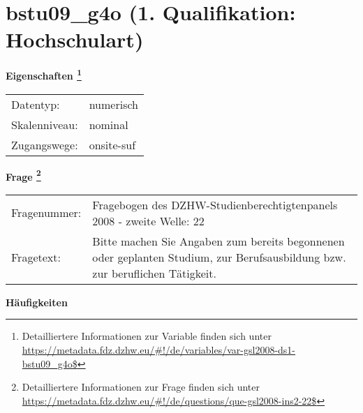 
    \setcounter{footnote}{0}

    \vspace*{-1.8cm}
	\section{bstu09\_g4o (1. Qualifikation: Hochschulart)}
	\label{section:bstu09_g4o}



    \vspace*{0.5cm}
    \noindent\textbf{Eigenschaften
	\footnote{Detailliertere Informationen zur Variable finden sich unter
		\url{https://metadata.fdz.dzhw.eu/\#!/de/variables/var-gsl2008-ds1-bstu09_g4o$}}}\\
	\begin{tabularx}{\hsize}{@{}lX}
	Datentyp: & numerisch \\
	Skalenniveau: & nominal \\
	Zugangswege: &
	  onsite-suf
 \\
    \end{tabularx}



				\vspace*{0.5cm}
                \noindent\textbf{Frage
	                \footnote{Detailliertere Informationen zur Frage finden sich unter
		              \url{https://metadata.fdz.dzhw.eu/\#!/de/questions/que-gsl2008-ins2-22$}}}\\
				\begin{tabularx}{\hsize}{@{}lX}
					Fragenummer: &
					  Fragebogen des DZHW-Studienberechtigtenpanels 2008 - zweite Welle:
					  22
 \\
					Fragetext: & Bitte machen Sie Angaben zum bereits begonnenen oder geplanten Studium, zur Berufsausbildung bzw. zur beruflichen Tätigkeit. \\
				\end{tabularx}





        		\vspace*{0.5cm}
                \noindent\textbf{Häufigkeiten}

